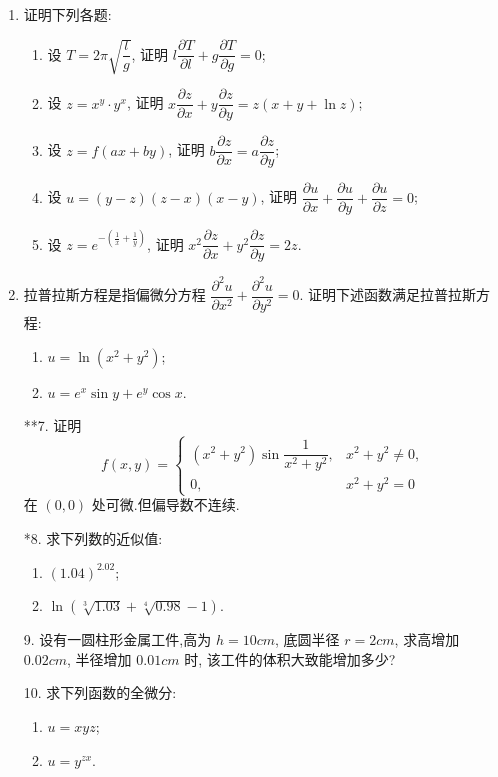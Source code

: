 \begin{enumerate}
    \item 证明下列各题:
    \begin{enumerate}[(1)]\setlength{\itemsep}{5pt}\setlength{\topsep}{15pt}
        \item 设 $T=2\pi\sqrt{\dfrac{l}{g}}$, 证明 $l\dfrac{\partial T}{\partial l}+g\dfrac{\partial T}{\partial g}=0$;
        \item 设 $z=x^y\cdot y^x$, 证明 $x\dfrac{\partial z}{\partial x}+y\dfrac{\partial z}{\partial y}=z(x+y+\ln z)$;
        \item 设 $z=f(ax+by)$, 证明 $b\dfrac{\partial z}{\partial x}=a\dfrac{\partial z}{\partial y}$;
        \item 设 $u=(y-z)(z-x)(x-y)$, 证明 $\dfrac{\partial u}{\partial x}+\dfrac{\partial u}{\partial y}+\dfrac{\partial u}{\partial z}=0$;
        \item 设 $z=e^{-(\frac{1}{x}+\frac{1}{y})}$, 证明 $x^2\dfrac{\partial z}{\partial x}+y^2\dfrac{\partial z}{\partial y}=2z$.
    \end{enumerate}

    \item 拉普拉斯方程是指偏微分方程 $\dfrac{\partial^2 u}{\partial x^2}+\dfrac{\partial^2 u}{\partial y^2}=0$. 证明下述函数满足拉普拉斯方程:
    \begin{enumerate}[(1)]\setlength{\itemsep}{5pt}\setlength{\topsep}{15pt}
        \item $u=\ln(x^2+y^2)$;
        \item $u=e^{x}\sin y+e^{y}\cos x$.
    \end{enumerate}

    \item[**7.] 证明
    \[
        f(x, y)=\begin{cases}
            (x^2+y^2)\sin\dfrac{1}{x^2+y^2},&x^2+y^2\not=0,\\
            0,&x^2+y^2=0
        \end{cases}
    \]
    在 $(0, 0)$ 处可微.但偏导数不连续.
    
    \item[*8.] 求下列数的近似值:
    \begin{enumerate}[(1)]\setlength{\itemsep}{5pt}\setlength{\topsep}{15pt}
        \item $(1.04)^{2.02}$;
        \item $\ln(\sqrt[3]{1.03}+\sqrt[4]{0.98}-1)$.
    \end{enumerate} 

    \item[9.] 设有一圆柱形金属工件,高为 $h=10 cm$, 底圆半径 $r=2 cm$, 求高增加 $0.02 cm$, 半径增加 $0.01 cm$ 时, 该工件的体积大致能增加多少?
    
    \item[10.] 求下列函数的全微分:
    \begin{enumerate}[(1)]\setlength{\itemsep}{5pt}\setlength{\topsep}{15pt}
        \item $u=xyz$;
        \item $u=y^{zx}$.
    \end{enumerate}
\end{enumerate}

